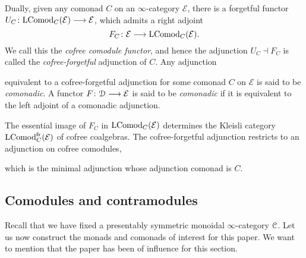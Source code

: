 \begin{definition}
    Dually, given any comonad $C$ on an $\infty$-category $\mathcal{E}$, there is a forgetful functor $U_C\colon \mathrm{LComod}_C(\mathcal{E})\longrightarrow \mathcal{E}$, which admits a right adjoint 
    \[F_C\colon \mathcal{E}\longrightarrow \mathrm{LComod}_C(\mathcal{E}).\] 
    We call this the \emph{cofree comodule functor}, and hence the adjunction $U_C\dashv F_C$ is called the \emph{cofree-forgetful} adjunction of $C$. Any adjunction 
    \begin{center}
    \end{center}
    equivalent to a cofree-forgetful adjunction for some comonad $C$ on $\mathcal{E}$ is said to be \emph{comonadic}. A functor $F\colon \EuScript{D}\longrightarrow \mathcal{E}$ is said to be \emph{comonadic} if it is equivalent to the left adjoint of a comonadic adjunction. 
\end{definition}

\begin{remark}
    The essential image of $F_C$ in $\mathrm{LComod}_C(\mathcal{E})$ determines the Kleisli category $\mathrm{LComod}_C^{\mathrm{fr}}(\mathcal{E})$ of cofree coalgebras. The cofree-forgetful adjunction restricts to an adjunction on cofree comodules, 
    \begin{center}
    \end{center}
    which is the minimal adjunction whose adjunction comonad is $C$. 
\end{remark}


\subsection{Comodules and contramodules}

Recall that we have fixed a presentably symmetric monoidal $\infty$-category $\EuScript{C}$. Let us now construct the monads and comonads of interest for this paper. We want to mention that the paper \cite{hristova-jones-rumynin_2023} has been of influence for this section.

